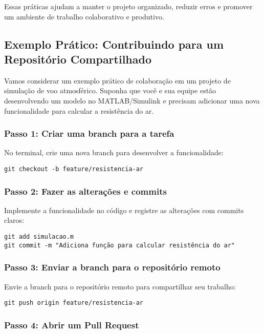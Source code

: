 Essas práticas ajudam a manter o projeto organizado, reduzir erros e promover um ambiente de trabalho colaborativo e produtivo.

\subsection{Exemplo Prático: Contribuindo para um Repositório Compartilhado}


Vamos considerar um exemplo prático de colaboração em um projeto de simulação de voo atmosférico. Suponha que você e sua equipe estão desenvolvendo um modelo no MATLAB/Simulink e precisam adicionar uma nova funcionalidade para calcular a resistência do ar.

\subsubsection*{Passo 1: Criar uma branch para a tarefa}

No terminal, crie uma nova branch para desenvolver a funcionalidade:
\begin{lstlisting}[style=shellstyle]
git checkout -b feature/resistencia-ar
\end{lstlisting}

\subsubsection*{Passo 2: Fazer as alterações e commits}

Implemente a funcionalidade no código e registre as alterações com commits claros:
\begin{lstlisting}[style=shellstyle]
git add simulacao.m
git commit -m "Adiciona função para calcular resistência do ar"
\end{lstlisting}

\subsubsection*{Passo 3: Enviar a branch para o repositório remoto}

Envie a branch para o repositório remoto para compartilhar seu trabalho:
\begin{lstlisting}[style=shellstyle]
git push origin feature/resistencia-ar
\end{lstlisting}

\subsubsection*{Passo 4: Abrir um Pull Request}

